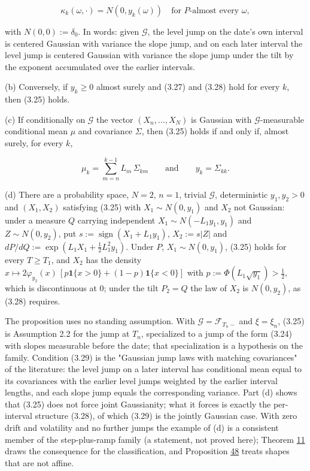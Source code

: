 \documentclass[11pt]{article}
\begin{document}
\begin{equation*}
\kappa_k(\omega, \cdot) = N(0, y_k(\omega)) \quad \text{for } P\text{-almost every } \omega, \tag{3.28}\label{eq:3.28}
\end{equation*}

with \(N(0, 0) := \delta_0\). In words: given \(\mathcal G\), the level jump on the date's own interval is centered Gaussian with variance the slope jump, and on each later interval the level jump is centered Gaussian with variance the slope jump under the tilt by the exponent accumulated over the earlier intervals.

(b) Conversely, if \(y_k \ge 0\) almost surely and (3.27) and (3.28) hold for every \(k\), then (3.25) holds.

(c) If conditionally on \(\mathcal G\) the vector \((X_n, \dots, X_N)\) is Gaussian with \(\mathcal G\)-measurable conditional mean \(\mu\) and covariance \(\Sigma\), then (3.25) holds if and only if, almost surely, for every \(k\),

\begin{equation*}
\mu_k = \sum_{m=n}^{k-1} L_m\, \Sigma_{km} \qquad \text{and} \qquad y_k = \Sigma_{kk}. \tag{3.29}\label{eq:3.29}
\end{equation*}

(d) There are a probability space, \(N = 2\), \(n = 1\), trivial \(\mathcal G\), deterministic \(y_1, y_2 > 0\) and \((X_1, X_2)\) satisfying (3.25) with \(X_1 \sim N(0, y_1)\) and \(X_2\) not Gaussian: under a measure \(Q\) carrying independent \(X_1 \sim N(-L_1 y_1, y_1)\) and \(Z \sim N(0, y_2)\), put \(s := \operatorname{sign}(X_1 + L_1 y_1)\), \(X_2 := s |Z|\) and \(dP/dQ := \exp(L_1 X_1 + \tfrac12 L_1^2 y_1)\). Under \(P\), \(X_1 \sim N(0, y_1)\), (3.25) holds for every \(T \ge T_1\), and \(X_2\) has the density \(x \mapsto 2 \varphi_{y_2}(x)\,[p \mathbf 1\{x > 0\} + (1 - p) \mathbf 1\{x < 0\}]\) with \(p := \Phi(L_1 \sqrt{y_1}) > \tfrac12\), which is discontinuous at \(0\); under the tilt \(P_2 = Q\) the law of \(X_2\) is \(N(0, y_2)\), as (3.28) requires.

The proposition uses no standing assumption. With \(\mathcal G = \mathcal F_{T_n-}\) and \(\xi = \xi_n\), (3.25) is Assumption 2.2 for the jump at \(T_n\), specialized to a jump of the form (3.24) with slopes measurable before the date; that specialization is a hypothesis on the family. Condition (3.29) is the "Gaussian jump laws with matching covariances" of the literature: the level jump on a later interval has conditional mean equal to its covariances with the earlier level jumps weighted by the earlier interval lengths, and each slope jump equals the corresponding variance. Part (d) shows that (3.25) does not force joint Gaussianity; what it forces is exactly the per-interval structure (3.28), of which (3.29) is the jointly Gaussian case. With zero drift and volatility and no further jumps the example of (d) is a consistent member of the step-plus-ramp family (a statement, not proved here); Theorem \hyperref[res:Theorem-11]{11} draws the consequence for the classification, and Proposition \hyperref[res:Proposition-48]{48} treats shapes that are not affine.
\end{document}
